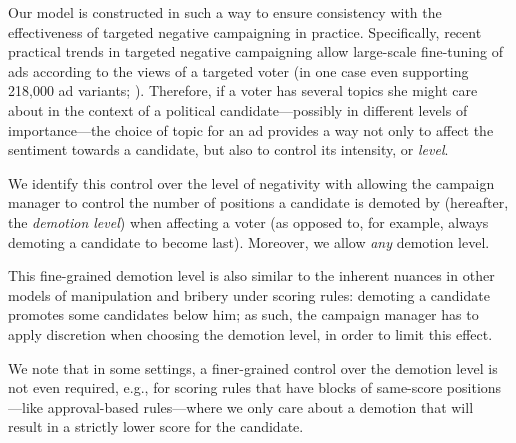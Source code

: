 \documentclass[letterpaper]{article} %
\begin{document}
Our model is constructed in such a way to ensure consistency with the effectiveness of targeted negative campaigning in practice. Specifically,
recent practical trends in targeted negative campaigning allow large-scale fine-tuning of ads according to the views of a targeted voter (in one case even supporting 218,000 ad variants; \citealp{guardian-trump-facebook-ad}). Therefore, if a voter has several topics she might care about in the context of a political candidate---possibly in different levels of importance---the choice of topic for an ad provides a way not only to affect  the sentiment towards a candidate, but also to control its intensity, or \emph{level}.

We identify this control over the level of negativity with allowing the campaign manager to control the number of positions a candidate is demoted by (hereafter, the \emph{demotion level}) when affecting a voter (as opposed to, for example, always demoting a candidate to become last). Moreover, we allow \emph{any} demotion level. 

This fine-grained demotion level is also similar to the inherent nuances in other models of manipulation and bribery under scoring rules: demoting a candidate promotes some candidates below him; as such, the campaign manager has to apply discretion when choosing the demotion level, in order to limit this effect.

We note that in some settings, a finer-grained control over the demotion level is  not even required, e.g., for scoring rules that have blocks of same-score positions---like approval-based rules---where we only care about a demotion that will result in a strictly lower score for the candidate.





\end{document}

